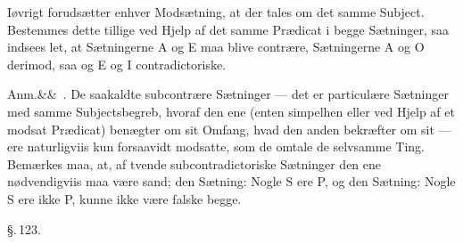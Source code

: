 \documentclass[12pt]{book}
\def\sperr#1{#1}%
\def\textit#1{#1}%
\def\emph#1{#1}%
\newcommand{\sperr}[1]{\textls[180]{#1}}
\newcommand{\parag}[1]{%
  \par\vspace{0.9\baselineskip}%
  {\centering\textit{\S.\,#1.}\par}%
  \vspace{0.35\baselineskip}%
  \noindent\hspace{\parindent}\ignorespaces
}
\newcommand{\anm}[1]{%
  \par\vspace{0.5\baselineskip}%
  \noindent\hspace{\parindent}\sperr{Anm.}\ifx&#1&\else~\textit{#1}.\fi
  \enspace\ignorespaces
}
\newcommand{\opage}[1]{\marginnote{\footnotesize\textit{[#1]}}}
\begin{document}
Iøvrigt forudsætter enhver Modsætning, at der tales om det samme Subject.
Bestemmes dette tillige ved Hjelp af det samme Prædicat i begge Sætninger, saa
indsees let, at Sætningerne \textit{A} og \textit{E} maa blive \emph{contrære},
Sætningerne \textit{A} og \textit{O} derimod, saa og \textit{E} og \textit{I}
\emph{contradictoriske}.
\opage{298} \anm{} De saakaldte subcontrære Sætninger --- det er particulære Sætninger med
samme Subjectsbegreb, hvoraf den ene (enten simpelhen eller ved Hjelp af et
modsat Prædicat) benægter om sit Omfang, hvad den anden bekræfter om sit ---
ere naturligviis kun forsaavidt modsatte, som de omtale de selvsamme Ting.
Bemærkes maa, at, af tvende subcontradictoriske Sætninger den ene
nødvendigviis maa være sand; den Sætning: Nogle \textit{S} ere \textit{P}, og
den Sætning: Nogle \textit{S} ere ikke \textit{P}, kunne ikke være falske
begge.

\parag{123}
\end{document}
